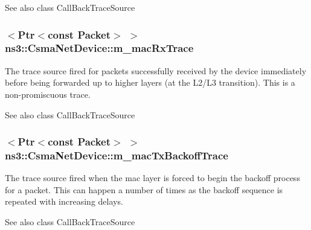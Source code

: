 \begin{DoxySeeAlso}{See also}
class Call\+Back\+Trace\+Source 
\end{DoxySeeAlso}
\subsubsection[{\texorpdfstring{m\+\_\+mac\+Rx\+Trace}{m_macRxTrace}}]{$<${\bf Ptr}$<$const {\bf Packet}$>$ $>$ ns3\+::\+Csma\+Net\+Device\+::m\+\_\+mac\+Rx\+Trace\hspace{0.3cm}{\ttfamily [private]}}\hypertarget{classns3_1_1CsmaNetDevice_a40f2a9fcb15d1e44fc918d1639bff18a}{}\label{classns3_1_1CsmaNetDevice_a40f2a9fcb15d1e44fc918d1639bff18a}
The trace source fired for packets successfully received by the device immediately before being forwarded up to higher layers (at the L2/\+L3 transition). This is a non-\/promiscuous trace.

\begin{DoxySeeAlso}{See also}
class Call\+Back\+Trace\+Source 
\end{DoxySeeAlso}
\subsubsection[{\texorpdfstring{m\+\_\+mac\+Tx\+Backoff\+Trace}{m_macTxBackoffTrace}}]{$<${\bf Ptr}$<$const {\bf Packet}$>$ $>$ ns3\+::\+Csma\+Net\+Device\+::m\+\_\+mac\+Tx\+Backoff\+Trace\hspace{0.3cm}{\ttfamily [private]}}\hypertarget{classns3_1_1CsmaNetDevice_a1f035d24ccf03e5731243e0b22665cb0}{}\label{classns3_1_1CsmaNetDevice_a1f035d24ccf03e5731243e0b22665cb0}
The trace source fired when the mac layer is forced to begin the backoff process for a packet. This can happen a number of times as the backoff sequence is repeated with increasing delays.

\begin{DoxySeeAlso}{See also}
class Call\+Back\+Trace\+Source 
\end{DoxySeeAlso}
